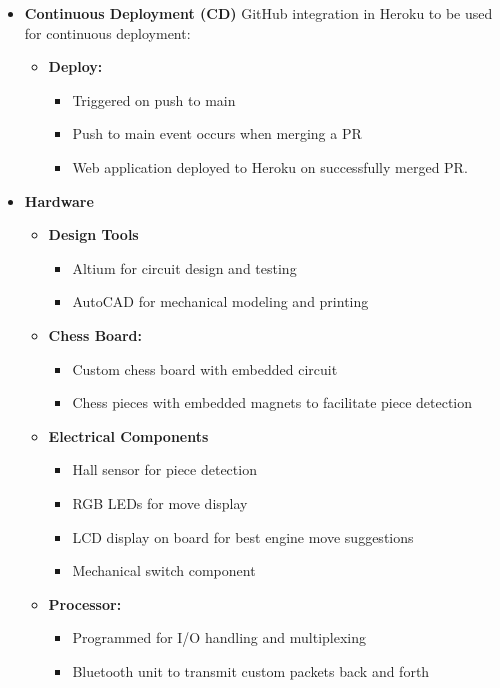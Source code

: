 \documentclass{article}
\begin{document}
\begin{itemize}
\begin{itemize}
\end{itemize}
\item \textbf{Continuous Deployment (CD)} GitHub integration in Heroku to be used for continuous deployment:
\begin{itemize}
    \item \textbf{Deploy:}
    \begin{itemize}
        \item Triggered on push to main
        \item Push to main event occurs when merging a PR
        \item Web application deployed to Heroku on successfully merged PR.
    \end{itemize}
\end{itemize}

\item \textbf{Hardware}
\begin{itemize}
    \item \textbf{Design Tools}
    \begin{itemize}
        \item Altium for circuit design and testing
        \item AutoCAD for mechanical modeling and printing
    \end{itemize}
    \item \textbf{Chess Board:}
    \begin{itemize}
        \item Custom chess board with embedded circuit 
        \item Chess pieces with embedded magnets to facilitate piece detection
    \end{itemize}
    \item \textbf{Electrical Components}
    \begin{itemize}
        \item Hall sensor for piece detection
        \item RGB LEDs for move display
        \item LCD display on board for best engine move suggestions
        \item Mechanical switch component
    \end{itemize}
    \item \textbf{Processor:}
    \begin{itemize}
        \item Programmed for I/O handling and multiplexing
        \item Bluetooth unit to transmit custom packets back and forth
    \end{itemize}

\end{itemize}
\end{itemize}
\end{document}
